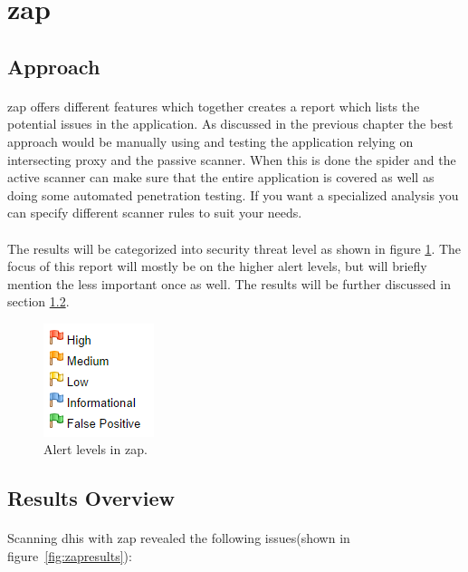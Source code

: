 \documentclass[11pt,english,a4paper]{report}
\begin{document}
\section{\gls{zap}}
\subsection{Approach}
\paragraph{}
\gls{zap} offers different features which together creates a report which lists the potential issues in the application. 
As discussed in the previous chapter the best approach would be manually using and testing the application relying on intersecting proxy and the passive scanner. 
When this is done the spider and the active scanner can make sure that the entire application is covered as well as doing some automated penetration testing. 
If you want a specialized analysis you can specify different scanner rules to suit your needs.

\paragraph{}
The results will be categorized into security threat level as shown in figure \ref{fig:zapalerts}.
The focus of this report will mostly be on the higher alert levels, but will briefly mention the less important once as well.
The results will be further discussed in section \ref{sec:zapresult-overview}.

\begin{figure}[h]
    \centering
    \includegraphics[scale=0.65]{images/alerts.png}
    \caption{Alert levels in \gls{zap}.}
    \label{fig:zapalerts}
\end{figure}


\subsection{Results Overview}
\label{sec:zapresult-overview}
\paragraph{}
Scanning \gls{dhis} with \gls{zap} revealed the following issues(shown in figure~\ref{fig:zapresults}):
\end{document}
